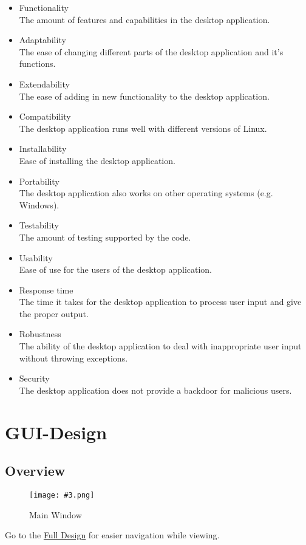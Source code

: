 \documentclass[10pt,a4paper]{report}
\newcommand{\attribute}[2]{
    #1 \leavevmode \\ #2
}
\newcommand{\h}[1]{\textcolor{col:highlight}{#1}}
\newcommand{\includeimage}[5]{
    \begin{figure}[H]
        #1
        \texttt{[image: \#3.png]}
        \caption{#4}
        \label{fig:#5}
    \end{figure}
}
\begin{document}
\begin{itemize}
    \renewcommand\labelitemi{++}
    \item \attribute{Functionality}{The amount of features and capabilities in the desktop application.}
    \item \attribute{Adaptability}{The ease of changing different parts of the desktop application and it's functions.}
    \item \attribute{Extendability}{The ease of adding in new functionality to the desktop application.}
    \renewcommand\labelitemi{+}
    \item \attribute{Compatibility}{The desktop application runs well with different versions of Linux.}
    \item \attribute{Installability}{Ease of installing the desktop application.}
    \item \attribute{Portability}{The desktop application also works on other operating systems (e.g. Windows).}
    \item \attribute{Testability}{The amount of testing supported by the code.}
    \item \attribute{Usability}{Ease of use for the users of the desktop application.}
    \item \attribute{Response time}{The time it takes for the desktop application to process user input and give the proper output.}
    \renewcommand\labelitemi{o}
    \item \attribute{Robustness}{The ability of the desktop application to deal with inappropriate user input without throwing exceptions.}
    \renewcommand\labelitemi{-}
    \item \attribute{Security}{The desktop application does not provide a backdoor for malicious users.}
\end{itemize}

\chapter{GUI-Design}
\section{Overview}
\includeimage{}{0.25}{Main Window}{Main Window}{main_window}
Go to the \href{https://www.figma.com/file/GP708HBs3aSgKMK5QeQZb5/GELF?node-id=0\%3A1}{\h{Full Design}} for easier navigation while viewing.

\end{document}
